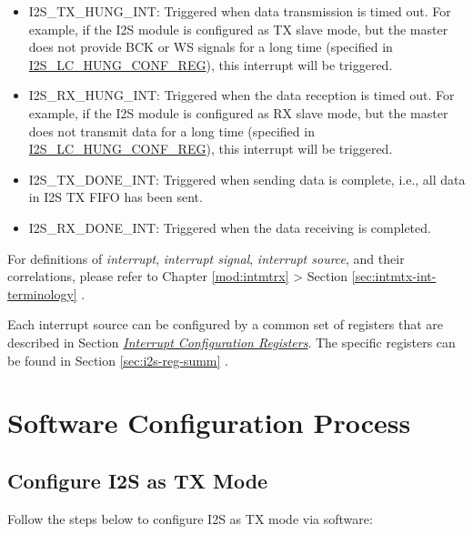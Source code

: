 \documentclass[main\_\_EN.tex]{subfiles}
\begin{document}
\begin{itemize}
\item \label{int:I2STXHUNGINT}I2S\_TX\_HUNG\_INT: Triggered when data transmission is timed out. For example, if the I2S module is configured as TX slave mode, but the master does not provide BCK or WS signals for a long time (specified in \hyperref[regdesc:I2SLCHUNGCONFREG]{I2S\_LC\_HUNG\_CONF\_REG}), this interrupt will be triggered.
\item \label{int:I2SRXHUNGINT}I2S\_RX\_HUNG\_INT: Triggered when the data reception is timed out. For example, if the I2S module is configured as RX slave mode, but the master does not transmit data for a long time (specified in \hyperref[regdesc:I2SLCHUNGCONFREG]{I2S\_LC\_HUNG\_CONF\_REG}), this interrupt will be triggered.
\item \label{int:I2STXDONEINT}I2S\_TX\_DONE\_INT: Triggered when sending data is complete, i.e., all data in I2S TX FIFO has been sent.
\item \label{int:I2SRXDONEINT}I2S\_RX\_DONE\_INT: Triggered when the data receiving is completed.
\end{itemize}

\begin{tiplisting}
For definitions of \textit{interrupt}, \textit{interrupt signal}, \textit{interrupt source}, and their correlations, please refer to Chapter \ref{mod:intmtrx} \textit{} > Section \ref{sec:intmtx-int-terminology} \textit{}.
\end{tiplisting}

Each interrupt source can be configured by a common set of registers that are described in Section \hyperref[interrupt-config-registers]{\textit{Interrupt Configuration Registers}}. The specific registers can be found in Section \ref{sec:i2s-reg-summ} \textit{}.

\section{Software Configuration Process}
\subsection{Configure I2S as TX Mode}\label{sec:i2s-configure-i2s-tx-mode}
Follow the steps below to configure I2S as TX mode via software:
\end{document}
